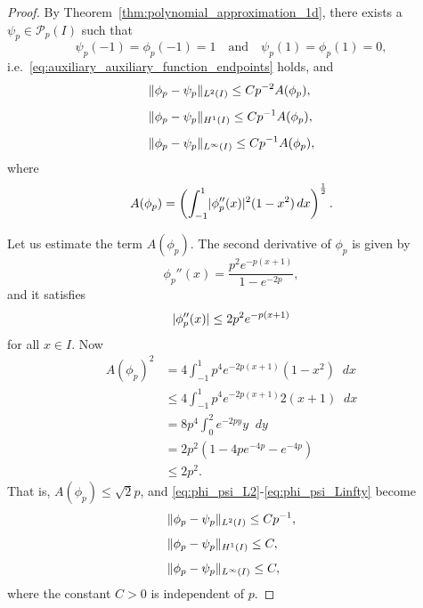 \documentclass[english, 12pt, a4paper, sci, utf8, a-2b, online]{aaltothesis}
\theoremstyle{definition}
\theoremstyle{plain}
\DeclarePairedDelimiter\abs{\lvert}{\rvert}
\DeclarePairedDelimiter\norm{\lVert}{\rVert}
\newcommand*\diff{\mathop{}\!d}
\numberwithin{equation}{section}
\begin{document}
\begin{proof}
    By Theorem~\ref{thm:polynomial_approximation_1d},
    there exists a $\psi_p \in \mathcal{P}_p(I)$ such that
    \begin{equation*}
        \psi_p(-1) = \phi_p(-1) = 1
        \quad \text{and} \quad
        \psi_p(1) = \phi_p(1) = 0,
    \end{equation*}
    i.e.\ \eqref{eq:auxiliary_auxiliary_function_endpoints} holds, and
    \begin{align}
        \label{eq:phi_psi_L2}
        &\norm{\phi_p-\psi_p}_{L^2(I)} \leq C p^{-2} A(\phi_p), \\[0.5em]
        \label{eq:phi_psi_H1}
        &\norm{\phi_p-\psi_p}_{H^1(I)} \leq C p^{-1} A(\phi_p), \\[0.5em]
        \label{eq:phi_psi_Linfty}
        &\norm{\phi_p-\psi_p}_{L^{\infty}(I)} \leq C p^{-1} A(\phi_p),
    \end{align}
    where
    \begin{equation*}
        A(\phi_p) = \left(
            \int_{-1}^{1} \abs{\phi_p''(x)}^2 (1-x^2) \diff x
            \right)^{\frac{1}{2}}.
    \end{equation*}
    
    Let us estimate the term $A(\phi_p)$.
    The second derivative of $\phi_p$ is given by
    \begin{equation*}
        \phi_p''(x) = \frac{p^2 e^{-p(x+1)}}{1 - e^{-2p}},
    \end{equation*}
    and it satisfies
    \begin{equation*}
        \abs{\phi_p''(x)} \leq 2 p^2 e^{-p(x+1)}
    \end{equation*}
    for all $x \in I$. Now
    \begin{align*}
        A(\phi_p)^2
        &= 4 \int_{-1}^{1} p^4 e^{-2p(x+1)} (1-x^2) \diff x \\
        &\leq 4 \int_{-1}^{1} p^4 e^{-2p(x+1)} 2 (x+1) \diff x \\
        &= 8 p^4 \int_{0}^{2} e^{-2py} y \diff y \\
        &= 2 p^2 (1 - 4pe^{-4p} - e^{-4p}) \\
        &\leq 2p^2.
    \end{align*}
    That is, $A(\phi_p) \leq \sqrt{2} p$, and
    \eqref{eq:phi_psi_L2}-\eqref{eq:phi_psi_Linfty} become
    \begin{align}
        \label{eq:phi_psi_L2_new}
        &\norm{\phi_p-\psi_p}_{L^2(I)} \leq C p^{-1}, \\[0.5em]
        \label{eq:phi_psi_H1_new}
        &\norm{\phi_p-\psi_p}_{H^1(I)} \leq C, \\[0.5em]
        \label{eq:phi_psi_Linfty_new}
        &\norm{\phi_p-\psi_p}_{L^{\infty}(I)} \leq C,
    \end{align}
    where the constant $C > 0$ is independent of $p$.


\end{proof}
\end{document}
